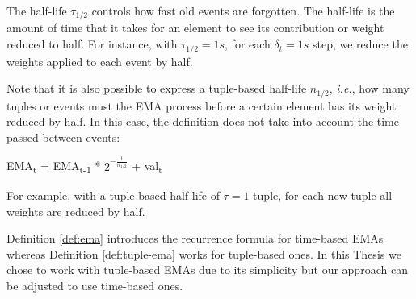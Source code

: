 The half-life $\tau_{1/2}$ controls how fast old events are forgotten. The half-life is the amount of time that it takes for an element to see its contribution or weight reduced to half. For instance, with $\tau_{1/2} = 1s$, for each $\delta_t = 1s$ step, we reduce the weights applied to each event by half. 

Note that it is also possible to express a tuple-based half-life $n_{1/2}$, \textit{i.e.}, how many tuples or events must the EMA process before a certain element has its weight reduced by half. In this case, the definition does not take into account the time passed between events:
\begin{definition}
EMA\textsubscript{t} = EMA\textsubscript{t-1} * $2^{-\frac{1}{n_{1/2}}}$ + val\textsubscript{t}
\label{def:tuple-ema}
\end{definition}
For example, with a tuple-based half-life of $\tau = 1$ tuple, for each new tuple all weights are reduced by half.

Definition \ref{def:ema} introduces the recurrence formula for time-based EMAs whereas Definition \ref{def:tuple-ema} works for tuple-based ones. In this Thesis we chose to work with tuple-based EMAs due to its simplicity but our approach can be adjusted to use time-based ones.